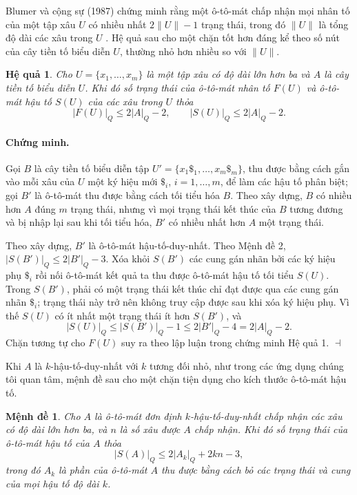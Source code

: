 \documentclass[11pt]{article}
\newtheorem{proposition}{Mệnh đề}
\newtheorem{corollary}{Hệ quả}
\newenvironment{proof}{\paragraph{Chứng minh.}}{\hfill$\dashv$\par}
\begin{document}
Blumer và cộng sự (1987) chứng minh rằng một ô-tô-mát chấp nhận mọi nhân tố
của một tập xâu $U$ có nhiều nhất $2\|U\|-1$ trạng thái, trong đó $\|U\|$ là
tổng độ dài các xâu trong $U$ \cite{blumer-complete}. Hệ quả sau cho một chặn
tốt hơn đáng kể theo số nút của cây tiền tố biểu diễn $U$, thường nhỏ hơn
nhiều so với $\|U\|$.

\begin{corollary}
Cho $U=\{x_1,\ldots,x_m\}$ là một tập xâu có độ dài lớn hơn ba và $A$ là cây
tiền tố biểu diễn $U$. Khi đó số trạng thái của ô-tô-mát nhân tố $F(U)$ và
ô-tô-mát hậu tố $S(U)$ của các xâu trong $U$ thỏa
\[
  |F(U)|_Q \le 2|A|_Q-2,\qquad
  |S(U)|_Q \le 2|A|_Q-2.
\tag{7}
\]
\end{corollary}

\begin{proof}
Gọi $B$ là cây tiền tố biểu diễn tập
$U'=\{x_1\mathtt{\$}_1,\ldots,x_m\mathtt{\$}_m\}$, thu được bằng cách gắn vào
mỗi xâu của $U$ một ký hiệu mới $\mathtt{\$}_i$, $i=1,\ldots,m$, để làm các
hậu tố phân biệt; gọi $B'$ là ô-tô-mát thu được bằng cách tối tiểu hóa $B$.
Theo xây dựng, $B$ có nhiều hơn $A$ đúng $m$ trạng thái, nhưng vì mọi trạng
thái kết thúc của $B$ tương đương và bị nhập lại sau khi tối tiểu hóa, $B'$ có
nhiều nhất hơn $A$ một trạng thái.

Theo xây dựng, $B'$ là ô-tô-mát hậu-tố-duy-nhất. Theo Mệnh đề 2,
$|S(B')|_Q\le 2|B'|_Q-3$. Xóa khỏi $S(B')$ các cung gán nhãn bởi các ký hiệu
phụ $\mathtt{\$}_i$ rồi nối ô-tô-mát kết quả ta thu được ô-tô-mát hậu tố tối
tiểu $S(U)$. Trong $S(B')$, phải có một trạng thái kết thúc chỉ đạt được qua
các cung gán nhãn $\mathtt{\$}_i$; trạng thái này trở nên không truy cập được
sau khi xóa ký hiệu phụ. Vì thế $S(U)$ có ít nhất một trạng thái ít hơn
$S(B')$, và
\[
  |S(U)|_Q \le |S(B')|_Q-1 \le 2|B'|_Q-4 = 2|A|_Q-2.
\tag{8}
\]
Chặn tương tự cho $F(U)$ suy ra theo lập luận trong chứng minh Hệ quả 1.
\end{proof}

Khi $A$ là $k$-hậu-tố-duy-nhất với $k$ tương đối nhỏ, như trong các ứng dụng
chúng tôi quan tâm, mệnh đề sau cho một chặn tiện dụng cho kích thước
ô-tô-mát hậu tố.

\begin{proposition}
Cho $A$ là ô-tô-mát đơn định $k$-hậu-tố-duy-nhất chấp nhận các xâu có độ dài
lớn hơn ba, và $n$ là số xâu được $A$ chấp nhận. Khi đó số trạng thái của
ô-tô-mát hậu tố của $A$ thỏa
\[
  |S(A)|_Q \le 2|A_k|_Q + 2kn - 3,
\tag{9}
\]
trong đó $A_k$ là phần của ô-tô-mát $A$ thu được bằng cách bỏ các trạng thái
và cung của mọi hậu tố độ dài $k$.
\end{proposition}
\end{document}
